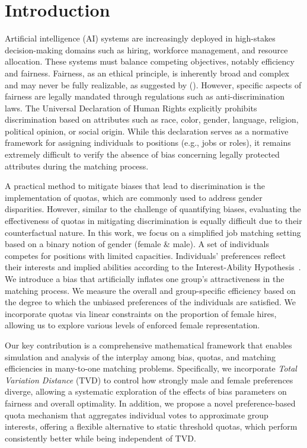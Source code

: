 \documentclass[letterpaper]{article}
\newcommand{\citet}[1]{\citeauthor{#1} (\citeyear{#1})}
\begin{document}
\section{Introduction}
Artificial intelligence (AI) systems are increasingly deployed in high-stakes decision-making domains such as hiring, workforce management, and resource allocation. These systems must balance competing objectives, notably efficiency and fairness. Fairness, as an ethical principle, is inherently broad and complex and may never be fully realizable, as suggested by \citet{Peterson_Hamrouni_2022}. However, specific aspects of fairness are legally mandated through regulations such as anti-discrimination laws. The Universal Declaration of Human Rights \cite{udhr1948} explicitly prohibits discrimination based on attributes such as race, color, gender, language, religion, political opinion, or social origin. While this declaration serves as a normative framework for assigning individuals to positions (e.g., jobs or roles), it remains extremely difficult to verify the absence of bias concerning legally protected attributes during the matching process.

A practical method to mitigate biases that lead to discrimination is the implementation of quotas, which are commonly used to address gender disparities. However, similar to the challenge of quantifying biases, evaluating the effectiveness of quotas in mitigating discrimination is equally difficult due to their counterfactual nature. In this work, we focus on a simplified job matching setting based on a binary notion of gender (female \& male). A set of individuals competes for positions with limited capacities. Individuals' preferences reflect their interests and implied abilities according to the Interest-Ability Hypothesis~\cite{jintelligence10030043}. We introduce a bias that artificially inflates one group's attractiveness in the matching process. We measure the overall and group-specific efficiency based on the degree to which the unbiased preferences of the individuals are satisfied. We incorporate quotas via linear constraints on the proportion of female hires, allowing us to explore various levels of enforced female representation. 

Our key contribution is a comprehensive mathematical framework that enables simulation and analysis of the interplay among bias, quotas, and matching efficiencies in many-to-one matching problems. Specifically, we incorporate \textit{Total Variation Distance} (TVD) to control how strongly male and female preferences diverge, allowing a systematic exploration of the effects of bias parameters on fairness and overall optimality. In addition, we propose a novel preference-based quota mechanism that aggregates individual votes to approximate group interests, offering a flexible alternative to static threshold quotas, which perform consistently better while being independent of TVD.
\end{document}
